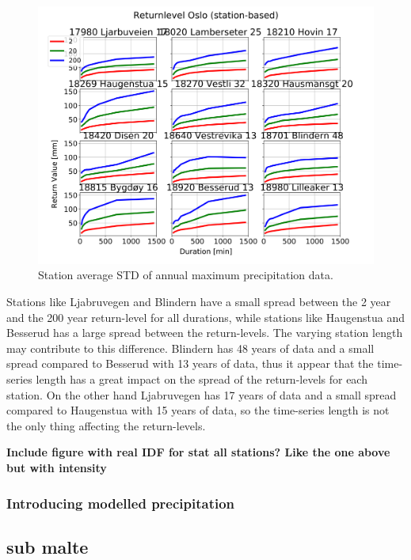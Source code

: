 \begin{figure}[hbt!]
    \centering
    \includegraphics[scale=0.3]{figures/IDF_stat_retper.png}
    \caption{Station average STD of annual maximum precipitation data.}
    \label{fig:IDF_stat_retper}
\end{figure}

Stations like Ljabruvegen and Blindern have a small spread between the 2 year and the 200 year return-level for all durations, while stations like Haugenstua and Besserud has a large spread between the return-levels. The varying station length may contribute to this difference. Blindern has 48 years of data and a small spread compared to Besserud with 13 years of data, thus it appear that the time-series length has a great impact on the spread of the return-levels for each station. On the other hand Ljabruvegen has 17 years of data and a small spread compared to Haugenstua with 15 years of data, so the time-series length is not the only thing affecting the return-levels.   

\textbf{Include figure with real IDF for stat all stations? Like the one above but with intensity} 



\subsubsection{Introducing modelled precipitation}

\subsection{sub malte}

